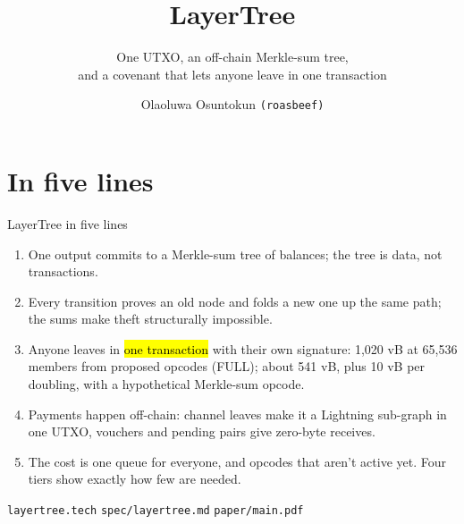 \documentclass[aspectratio=169,10pt]{beamer}
\title{LayerTree}
\subtitle{One UTXO, an off-chain Merkle-sum tree,\\and a covenant that lets anyone leave in one transaction}
\author{Olaoluwa Osuntokun \texttt{(roasbeef)}}
\date{}
\begin{document}
\begin{frame}[plain]
\end{frame}

\section{In five lines}

\begin{frame}{LayerTree in five lines}
  \begin{enumerate}
    \item One output commits to a Merkle-sum tree of balances; the tree is data, not transactions.
    \item Every transition proves an old node and folds a new one up the same path; the sums make theft structurally impossible.
    \item Anyone leaves in \hl{one transaction} with their own signature: 1,020 vB at 65,536 members from proposed opcodes (FULL); about 541 vB, plus 10 vB per doubling, with a hypothetical Merkle-sum opcode.
    \item Payments happen off-chain: channel leaves make it a Lightning sub-graph in one UTXO, vouchers and pending pairs give zero-byte receives.
    \item The cost is one queue for everyone, and opcodes that aren't active yet. Four tiers show exactly how few are needed.
  \end{enumerate}
  \vspace{1em}
  \centering
  {\small \texttt{layertree.tech} \quad \texttt{spec/layertree.md} \quad \texttt{paper/main.pdf}}
\end{frame}
\end{document}
